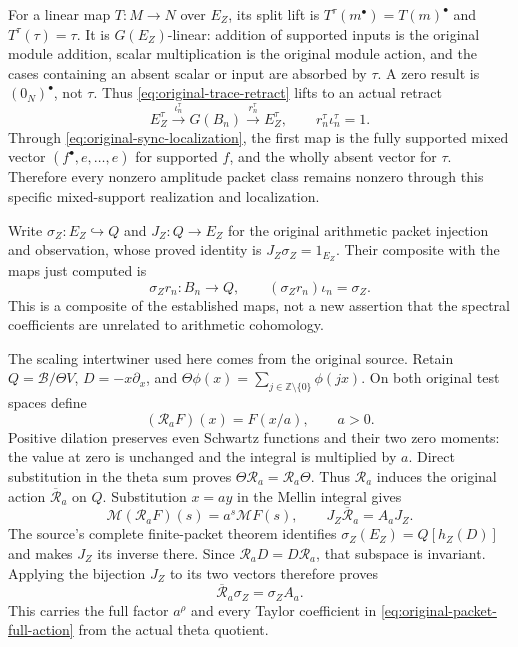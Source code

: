 For a linear map $T:M\to N$ over $E_Z$, its split lift is
$T^\tau(m^\bullet)=T(m)^\bullet$ and $T^\tau(\tau)=\tau$.
It is $G(E_Z)$-linear: addition of supported inputs is the original
module addition, scalar multiplication is the original module action,
and the cases containing an absent scalar or input are absorbed by
$\tau$. A zero result is $(0_N)^\bullet$, not $\tau$.
Thus \eqref{eq:original-trace-retract} lifts to an actual retract
\begin{equation}
 E_Z^\tau\xrightarrow{\iota_n^\tau}G(B_n)
 \xrightarrow{r_n^\tau}E_Z^\tau,
 \qquad r_n^\tau\iota_n^\tau=1.
 \label{eq:original-split-retract}
\end{equation}
Through \eqref{eq:original-sync-localization}, the first map is the
fully supported mixed vector $(f^\bullet,e,\ldots,e)$ for supported
$f$, and the wholly absent vector for $\tau$. Therefore every
nonzero amplitude packet class remains nonzero through this specific
mixed-support realization and localization.

Write $\sigma_Z:E_Z\hookrightarrow Q$ and $J_Z:Q\to E_Z$ for
the original arithmetic packet injection and observation, whose
proved identity is $J_Z\sigma_Z=1_{E_Z}$. Their composite with the
maps just computed is
\[
 \sigma_Zr_n:B_n\longrightarrow Q,\qquad
 (\sigma_Zr_n)\iota_n=\sigma_Z.
\]
This is a composite of the established maps, not a new assertion that
the spectral coefficients are unrelated to arithmetic cohomology.

The scaling intertwiner used here comes from the original source.
Retain $Q=\mathscr B/\Theta V$, $D=-x\partial_x$, and
$\Theta\phi(x)=\sum_{j\in\mathbb Z\setminus\{0\}}\phi(jx)$.
On both original test spaces define
\[
 (\mathcal R_aF)(x)=F(x/a),\qquad a>0.
\]
Positive dilation preserves even Schwartz functions and their two
zero moments: the value at zero is unchanged and the integral is
multiplied by $a$. Direct substitution in the theta sum proves
$\Theta\mathcal R_a=\mathcal R_a\Theta$.
Thus $\mathcal R_a$ induces the original action $\overline{\mathcal R}_a$
on $Q$. Substitution $x=ay$ in the Mellin integral gives
\[
 \mathcal M(\mathcal R_aF)(s)=a^s\mathcal MF(s),\qquad
 J_Z\overline{\mathcal R}_a=A_aJ_Z.
\]
The source's complete finite-packet theorem identifies
$\sigma_Z(E_Z)=Q[h_Z(D)]$ and makes $J_Z$ its inverse there.
Since $\mathcal R_aD=D\mathcal R_a$, that subspace is invariant.
Applying the bijection $J_Z$ to its two vectors therefore proves
\[
 \overline{\mathcal R}_a\sigma_Z=\sigma_ZA_a.
\]
This carries the full factor $a^\rho$ and every Taylor coefficient in
\eqref{eq:original-packet-full-action} from the actual theta quotient.


